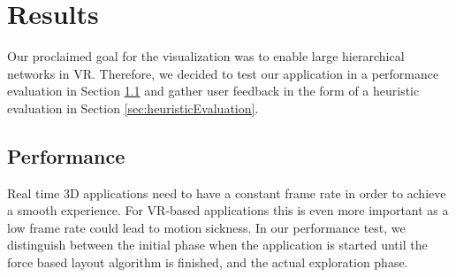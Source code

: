 \chapter{Results}

Our proclaimed goal for the visualization was to enable large hierarchical networks in VR. 
Therefore, we decided to test our application in a performance evaluation in Section \ref{sec:performanceEvaluation} and gather user feedback in the form of a heuristic evaluation in Section \ref{sec:heuristicEvaluation}.

\section{Performance}
\label{sec:performanceEvaluation}

Real time 3D applications need to have a constant frame rate in order to achieve a smooth experience.
For VR-based applications this is even more important as a low frame rate could lead to motion sickness. 
In our performance test, we distinguish between the initial phase when the application is started until the force based layout algorithm is finished, and the actual exploration phase. 

